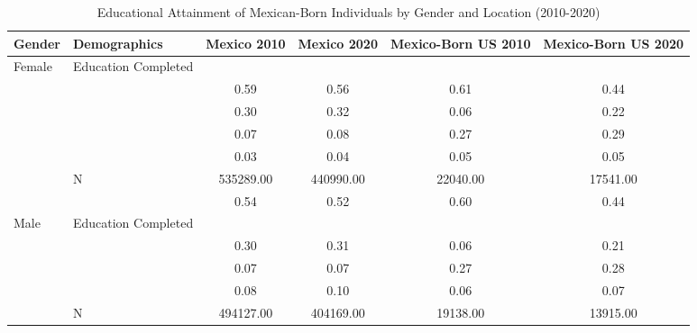 \begin{table}[ht]
\centering
\caption{Educational Attainment of Mexican-Born Individuals by Gender and Location (2010-2020)} 
\begin{tabular}{l>{\raggedright\arraybackslash}p{3.2cm}|cccc}
  \hline
Gender & Demographics & Mexico 2010 & Mexico 2020 & Mexico-Born US 2010 & Mexico-Born US 2020 \\ 
  \hline
Female & Education Completed &  &  &  &  \\ 
   & \multicolumn{1}{>{\raggedleft\arraybackslash}p{3.2cm}|}{\makebox[3.2cm][r]{Less than Primary }} & 0.59 & 0.56 & 0.61 & 0.44 \\ 
   & \multicolumn{1}{>{\raggedleft\arraybackslash}p{1.7cm}|}{\makebox[1.7cm][r]{Primary }} & 0.30 & 0.32 & 0.06 & 0.22 \\ 
   & \multicolumn{1}{>{\raggedleft\arraybackslash}p{2cm}|}{\makebox[2cm][r]{Secondary }} & 0.07 & 0.08 & 0.27 & 0.29 \\ 
   & \multicolumn{1}{>{\raggedleft\arraybackslash}p{2cm}|}{\makebox[2cm][r]{University }} & 0.03 & 0.04 & 0.05 & 0.05 \\ 
   & N & 535289.00 & 440990.00 & 22040.00 & 17541.00 \\ 
   & \multicolumn{1}{>{\raggedleft\arraybackslash}p{3.2cm}|}{\makebox[3.2cm][r]{Less than Primary }} & 0.54 & 0.52 & 0.60 & 0.44 \\ 
  Male & Education Completed &  &  &  &  \\ 
   & \multicolumn{1}{>{\raggedleft\arraybackslash}p{1.7cm}|}{\makebox[1.7cm][r]{Primary }} & 0.30 & 0.31 & 0.06 & 0.21 \\ 
   & \multicolumn{1}{>{\raggedleft\arraybackslash}p{2cm}|}{\makebox[2cm][r]{Secondary }} & 0.07 & 0.07 & 0.27 & 0.28 \\ 
   & \multicolumn{1}{>{\raggedleft\arraybackslash}p{2cm}|}{\makebox[2cm][r]{University }} & 0.08 & 0.10 & 0.06 & 0.07 \\ 
   & N & 494127.00 & 404169.00 & 19138.00 & 13915.00 \\ 
   \hline
\end{tabular}
\end{table}
